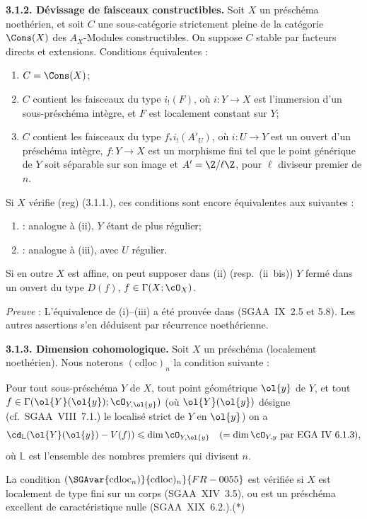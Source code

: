 \textbf{3.1.2. Dévissage de faisceaux constructibles.} Soit $X$ un préschéma noethérien, et soit $C$ une sous-catégorie strictement pleine de la catégorie $\Cons(X)$ des $A_X$-Modules constructibles. On suppose $C$ stable par facteurs directs et extensions. Conditions équivalentes :
\begin{enumerate}
\item[(i)] $C = \Cons(X)$;
\item[(ii)] $C$ contient les faisceaux du type $i_{!}(F)$, où $i : Y \to X$ est l'immersion d'un sous-préschéma intègre, et $F$ est localement constant sur $Y$;
\item[(iii)] $C$ contient les faisceaux du type $f_{*}i_{!}(A'_U)$, où $i : U \to Y$ est un ouvert d'un préschéma intègre, $f : Y \to X$ est un morphisme fini tel que le point générique de $Y$ soit séparable sur son image et $A' = \Z/\ell\Z$, pour $\ell$ diviseur premier de $n$.
\end{enumerate}
Si $X$ vérifie (reg) (3.1.1.), ces conditions sont encore équivalentes aux suivantes :
\begin{enumerate}
\item[(ii~bis)] : analogue à (ii), $Y$ étant de plus régulier;
\item[(iii~bis)] : analogue à (iii), avec $U$ régulier.
\end{enumerate}
Si en outre $X$ est affine, on peut supposer dans (ii) (resp.~(ii~bis)) $Y$ fermé dans un ouvert du type $D(f)$, $f \in \Gamma(X; \cO_X)$.

\emph{Preuve} : L'équivalence de (i)--(iii) a été prouvée dans (SGAA~IX~2.5 et 5.8). Les autres assertions s'en déduisent par récurrence noethérienne.

\textbf{3.1.3. Dimension cohomologique.} Soit $X$ un préschéma (localement noethérien). Nous noterons $(\underline{\mathrm{cdloc}})_n$ la condition suivante :

Pour tout sous-préschéma $Y$ de $X$, tout point géométrique $\ol{y}$ de $Y$, et tout 
$f \in \Gamma(\ol{Y}(\ol{y}); \cO_{Y,\ol{y}})$ (où $\ol{Y}(\ol{y})$
désigne (cf.~SGAA~VIII~7.1.) le localisé strict de $Y$ en $\ol{y}$) on a
\[
\cd_{\mathbb{L}}(\ol{Y}(\ol{y}) - V(f)) \leqslant \dim \cO_{Y,\ol{y}} \quad (= \dim \cO_{Y,y} \text{ par EGA~IV~6.1.3}),
\]
où $\mathbb{L}$ est l'ensemble des nombres premiers qui divisent $n$.

La condition $(\SGAvar{\mathrm{cdloc}_n)}{\mathrm{cdloc})_n}{FR-0055}$ est vérifiée si $X$ est localement de type fini sur un corps (SGAA~XIV~3.5), ou est un préschéma excellent de caractéristique nulle (SGAA~XIX~6.2.).(*)

